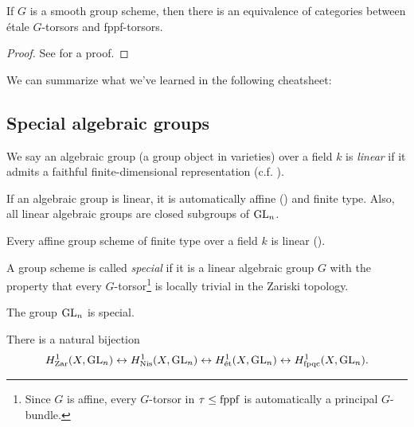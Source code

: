 \documentclass[11pt]{amsart}
\begin{document}
\begin{corollary} If $G$ is a smooth group scheme, then there is an equivalence of categories between \'etale $G$-torsors and fppf-torsors.
\end{corollary}
\begin{proof} See \cite[Proposition~4]{chd} for a proof.
\end{proof}

We can summarize what we've learned in the following cheatsheet:





\subsection{Special algebraic groups}


\begin{definition} We say an algebraic group (a group object in varieties) over a field $k$ is \textit{linear} if it admits a faithful finite-dimensional representation (c.f. \cite[p.~72]{MilneAG}).
\end{definition}

\begin{note} If an algebraic group is linear, it is automatically affine (\cite[1.29]{MilneAG}) and finite type. Also, all linear algebraic groups are closed subgroups of $\mathrm{GL}_n$.
\end{note}


\begin{proposition} Every affine group scheme of finite type over a field $k$ is linear (\cite[4.8]{MilneAG}).
\end{proposition}



\begin{definition} \cite[p.~5-11]{Grothendieck-torsion} A group scheme is called \textit{special} if it is a linear algebraic group $G$ with the property that every $G$-torsor\footnote{Since $G$ is affine, every $G$-torsor in $\tau\le \mathrm{fppf}$ is automatically a principal $G$-bundle.} is locally trivial in the Zariski topology.
\end{definition}

\begin{theorem} \cite[Th\'eor\`eme~3]{Grothendieck-torsion} The group $\mathrm{GL}_n$ is special.
\end{theorem}

\begin{corollary} \cite[11.4]{MilneLEC} There is a natural bijection
\begin{align*}
    H^1_{\mathrm{Zar}}(X,\mathrm{GL}_n) \leftrightarrow H^1_{\mathrm{Nis}}(X,\mathrm{GL}_n) \leftrightarrow H^1_{\text{\'{e}t}}(X,\mathrm{GL}_n) \leftrightarrow H^1_{\mathrm{fpqc}}(X,\mathrm{GL}_n).
\end{align*}
\end{corollary}
\end{document}
